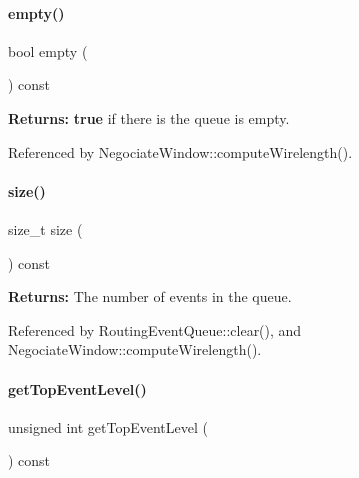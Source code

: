 \paragraph{\texorpdfstring{empty()}{empty()}}
{\footnotesize\ttfamily bool empty (\begin{DoxyParamCaption}{ }\end{DoxyParamCaption}) const\hspace{0.3cm}{\ttfamily [inline]}}

{\bfseries Returns\+:} {\bfseries true} if there is the queue is empty. 

Referenced by Negociate\+Window\+::compute\+Wirelength().

\mbox{\label{classKite_1_1RoutingEventQueue_a259cb5a711406a8c3e5d937eb9350cca}} 
\paragraph{\texorpdfstring{size()}{size()}}
{\footnotesize\ttfamily size\+\_\+t size (\begin{DoxyParamCaption}{ }\end{DoxyParamCaption}) const\hspace{0.3cm}{\ttfamily [inline]}}

{\bfseries Returns\+:} The number of events in the queue. 

Referenced by Routing\+Event\+Queue\+::clear(), and Negociate\+Window\+::compute\+Wirelength().

\mbox{\label{classKite_1_1RoutingEventQueue_a85befa55ce7e51c7067f4f7cb29acc0a}} 
\paragraph{\texorpdfstring{get\+Top\+Event\+Level()}{getTopEventLevel()}}
{\footnotesize\ttfamily unsigned int get\+Top\+Event\+Level (\begin{DoxyParamCaption}{ }\end{DoxyParamCaption}) const\hspace{0.3cm}{\ttfamily [inline]}}

